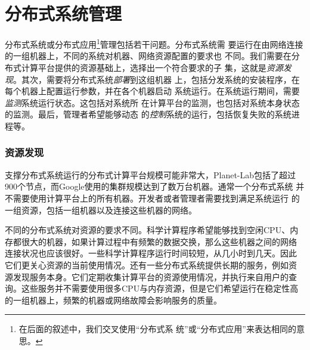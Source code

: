 




% 
% 
% 
% 
% 

\section{分布式系统管理}

分布式系统或分布式应用\footnote{在后面的叙述中，我们交叉使用“分布式系
统”或“分布式应用”来表达相同的意思。}管理包括若干问题。分布式系统需
要运行在由网络连接的一组机器上，不同的系统对机器、网络资源配置的要求也
不同。我们需要在分布式计算平台提供的资源基础上，选择出一个符合要求的子
集，这就是\emph{资源发现}。其次，需要将分布式系统\emph{部署}到这组机器
上，包括分发系统的安装程序，在每个机器上配置运行参数，并在各个机器启动
系统运行。在系统运行期间，需要\emph{监测}系统运行状态。这包括对系统所
在计算平台的监测，也包括对系统本身状态的监测。最后，管理者希望能够动态
的\emph{控制}系统的运行，包括恢复失败的系统进程等。

\subsubsection*{资源发现}

支撑分布式系统运行的分布式计算平台规模可能非常大，Planet-Lab包括了超过
900个节点，而Google使用的集群规模达到了数万台机器。通常一个分布式系统
并不需要使用计算平台上的所有机器。开发者或者管理者需要找到满足系统运行
的一组资源，包括一组机器以及连接这些机器的网络。

不同的分布式系统对资源的要求不同。科学计算程序希望能够找到空闲CPU、内
存都很大的机器，如果计算过程中有频繁的数据交换，那么这些机器之间的网络
连接状况也应该很好。一些科学计算程序运行时间较短，从几小时到几天。因此
它们更关心资源的当前使用情况。还有一些分布式系统提供长期的服务，例如资
源发现服务本身。它们定期收集计算平台的资源使用情况，并执行来自用户的查
询。这些服务并不需要使用很多CPU与内存资源，但是它们希望运行在稳定性高
的一组机器上，频繁的机器或网络故障会影响服务的质量。

